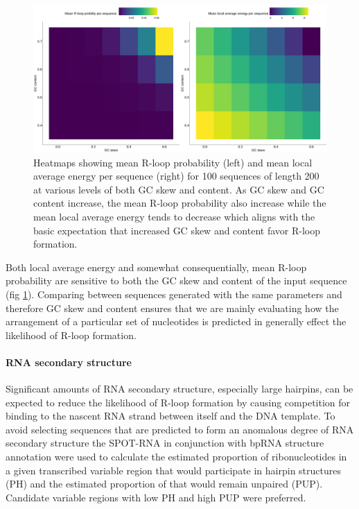 \documentclass[11pt]{article}
\begin{document}
\begin{figure}[H]
	\includegraphics[width=14cm]{images/plots/rlooper_expect_tile.png}
	\centering
	\caption{Heatmaps showing mean R-loop probability (left) and mean local average energy per sequence (right) for 100 sequences of length 200 at various levels of both GC skew and content. As GC skew and GC content increase, the mean R-loop probability also increase while the mean local average energy tends to decrease which aligns with the basic expectation that increased GC skew and content favor R-loop formation.}
	\label{fig:rlooper-expect}
\end{figure}

Both local average energy and somewhat consequentially, mean R-loop probability are sensitive to both the GC skew and content of the input sequence (fig \ref{fig:rlooper-expect}). Comparing between sequences generated with the same parameters and therefore GC skew and content ensures that we are mainly evaluating how the arrangement of a particular set of nucleotides is predicted in generally effect the likelihood of R-loop formation.


\paragraph{RNA secondary structure}

Significant amounts of RNA secondary structure, especially large hairpins, can be expected to reduce the likelihood of R-loop formation by causing competition for binding to the nascent RNA strand between itself and the DNA template. To avoid selecting sequences that are predicted to form an anomalous degree of RNA secondary structure the SPOT-RNA in conjunction with bpRNA structure annotation \cite{Singh2019, Danaee2018} were used to calculate the estimated proportion of ribonucleotides in a given transcribed variable region that would participate in hairpin structures (PH) and the estimated proportion of that would remain unpaired (PUP). Candidate variable regions with low PH and high PUP were preferred.
\end{document}
